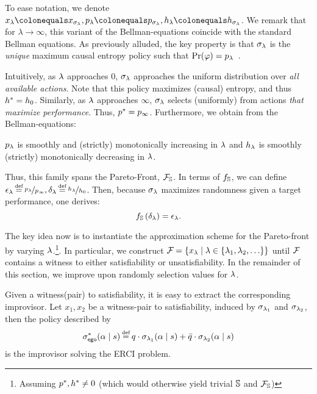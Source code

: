 To ease notation, we denote $x_\rat \colonequals x_{\sched_\rat},
\scp_\rat \colonequals \scp_{\sched_\rat}, \rndp_\rat \colonequals
\rndp_{\sched_\rat}$. 
We remark that for $\lambda \rightarrow \infty$, this variant of the Bellman-equations coincide with the standard Bellman equations.
As previously alluded, the key property
is that $\sigma_\lambda$ is the \emph{unique} maximum causal entropy policy
such that $\Pr(\varphi) = p_\lambda$~\cite{DBLP:conf/cav/Vazquez-Chanlatte20}.

Intuitively, as $\lambda$ approaches $0$, $\sigma_\lambda$ approaches the
uniform distribution over \emph{all available actions}. Note that this
policy maximizes (causal) entropy, and thus $h^{*} = h_0$.
Similarly, as $\lambda$ approaches $\infty$, $\sigma_\lambda$ selects (uniformly) from
actions \emph{that maximize performance}. Thus, $p^{*} = p_\infty$.
Furthermore, we obtain from the Bellman-equations:
\begin{proposition}
  $p_\lambda$ is smoothly and (strictly) monotonically increasing in $\lambda$ and $h_\lambda$
  is smoothly (strictly) monotonically decreasing in $\lambda$.
\end{proposition}
Thus, this
family spans the Pareto-Front, $\mathcal{F}_{\mathbb{S}}$.
In terms of $f_\mathbb{S}$, we 
can define $\epsilon_\rat \eqdef \nicefrac{\scp_\rat}{\scp_\infty}, \delta_\rat \eqdef \nicefrac{\rndp_\rat}{\rndp_0}$. Then, because
$\sigma_\lambda$ maximizes randomness given a target performance, one derives:
\begin{equation}
  f_\mathbb{S}\left(\delta_\lambda\right) = \epsilon_\lambda.
\end{equation}


The key idea now is to instantiate the approximation scheme for the Pareto-front by varying $\lambda$.\footnote{Assuming $p^{*}, h^{*} \neq 0$ (which would
otherwise yield trivial $\mathbb{S}$ and $\mathcal{F}_{\mathbb{S}}$)}.
In particular, we construct $\mathcal{F}_{} = \{ x_\lambda \mid \lambda \in \{ \lambda_1, \lambda_2, \hdots \} \}$ until $\mathcal{F}_{}$ contains a witness to either satisfiability or unsatisfiability. 
In the remainder of this section, we improve upon randomly selection values for $\lambda$.

\begin{remark}
Given a witness(pair) to satisfiability, it is easy to extract the corresponding improvisor. Let $x_1,x_2$ be a witness-pair to satisfiability, induced by $\sigma_{\lambda_1}$ and $\sigma_{\lambda_2}$, then the policy described by  	
\begin{equation}\label{eq:4}
  \sigma^*_\pOne(\act \mid s) \eqdef q\cdot \sched_{\rat_1}(\act \mid s) + \bar{q} \cdot \sched_{\rat_2}(\act  \mid s)
\end{equation}
is the improvisor solving the ERCI problem.
\end{remark}



